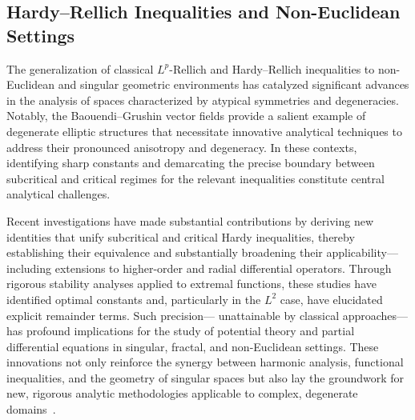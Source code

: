 \documentclass[sigconf]{acmart}
\begin{document}
\subsection{Hardy--Rellich Inequalities and Non-Euclidean Settings}

The generalization of classical $L^p$-Rellich and Hardy--Rellich inequalities to non-Euclidean and singular geometric environments has catalyzed significant advances in the analysis of spaces characterized by atypical symmetries and degeneracies. Notably, the Baouendi--Grushin vector fields provide a salient example of degenerate elliptic structures that necessitate innovative analytical techniques to address their pronounced anisotropy and degeneracy. In these contexts, identifying sharp constants and demarcating the precise boundary between subcritical and critical regimes for the relevant inequalities constitute central analytical challenges.

Recent investigations have made substantial contributions by deriving new identities that unify subcritical and critical Hardy inequalities, thereby establishing their equivalence and substantially broadening their applicability—including extensions to higher-order and radial differential operators. Through rigorous stability analyses applied to extremal functions, these studies have identified optimal constants and, particularly in the $L^2$ case, have elucidated explicit remainder terms. Such precision— unattainable by classical approaches—has profound implications for the study of potential theory and partial differential equations in singular, fractal, and non-Euclidean settings. These innovations not only reinforce the synergy between harmonic analysis, functional inequalities, and the geometry of singular spaces but also lay the groundwork for new, rigorous analytic methodologies applicable to complex, degenerate domains~\cite{ref105}.
\end{document}
